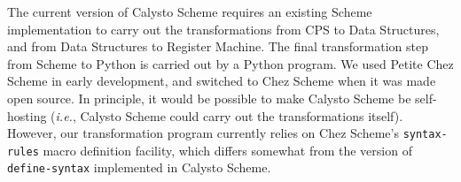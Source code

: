 \documentclass[acmsmall,screen,anonymous,review]{acmart}
\begin{document}
The current version of Calysto Scheme requires an existing Scheme
implementation to carry out the transformations from CPS to Data Structures,
and from Data Structures to Register Machine.  The final transformation step
from Scheme to Python is carried out by a Python program.  We used Petite Chez
Scheme in early development, and switched to Chez Scheme when it was made open
source. In principle, it would be possible to make Calysto Scheme be
self-hosting (\emph{i.e.}, Calysto Scheme could carry out the transformations
itself). However, our transformation program currently relies on Chez Scheme's
\texttt{syntax-rules} macro definition facility, which differs somewhat from
the version of \texttt{define-syntax} implemented in Calysto Scheme.

\end{document}
